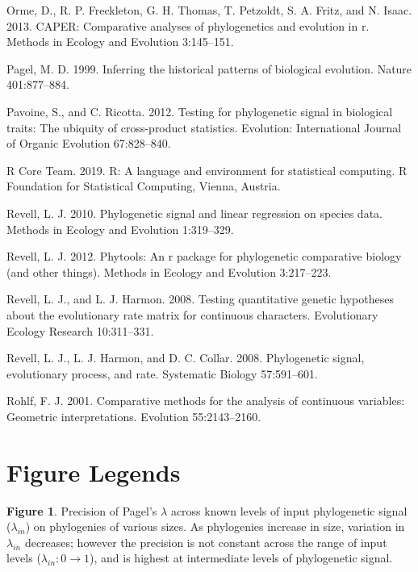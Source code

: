 \documentclass[
]{article}
\begin{document}
\leavevmode\hypertarget{ref-Orme2013}{}%
Orme, D., R. P. Freckleton, G. H. Thomas, T. Petzoldt, S. A. Fritz, and
N. Isaac. 2013. CAPER: Comparative analyses of phylogenetics and
evolution in r. Methods in Ecology and Evolution 3:145--151.

\leavevmode\hypertarget{ref-Pagel1999}{}%
Pagel, M. D. 1999. Inferring the historical patterns of biological
evolution. Nature 401:877--884.

\leavevmode\hypertarget{ref-Pavoine2012}{}%
Pavoine, S., and C. Ricotta. 2012. Testing for phylogenetic signal in
biological traits: The ubiquity of cross-product statistics. Evolution:
International Journal of Organic Evolution 67:828--840.

\leavevmode\hypertarget{ref-RCT}{}%
R Core Team. 2019. R: A language and environment for statistical
computing. R Foundation for Statistical Computing, Vienna, Austria.

\leavevmode\hypertarget{ref-Revell2010}{}%
Revell, L. J. 2010. Phylogenetic signal and linear regression on species
data. Methods in Ecology and Evolution 1:319--329.

\leavevmode\hypertarget{ref-Revell2012}{}%
Revell, L. J. 2012. Phytools: An r package for phylogenetic comparative
biology (and other things). Methods in Ecology and Evolution 3:217--223.

\leavevmode\hypertarget{ref-RevellHarmon2008}{}%
Revell, L. J., and L. J. Harmon. 2008. Testing quantitative genetic
hypotheses about the evolutionary rate matrix for continuous characters.
Evolutionary Ecology Research 10:311--331.

\leavevmode\hypertarget{ref-Revell_et_al2008}{}%
Revell, L. J., L. J. Harmon, and D. C. Collar. 2008. Phylogenetic
signal, evolutionary process, and rate. Systematic Biology 57:591--601.

\leavevmode\hypertarget{ref-Rohlf2001}{}%
Rohlf, F. J. 2001. Comparative methods for the analysis of continuous
variables: Geometric interpretations. Evolution 55:2143--2160.

\newpage

\hypertarget{figure-legends}{%
\section{Figure Legends}\label{figure-legends}}

\textbf{Figure 1}. Precision of Pagel's \(\lambda\) across known levels
of input phylogenetic signal (\(\lambda_{in}\)) on phylogenies of
various sizes. As phylogenies increase in size, variation in
\(\lambda_{in}\) decreases; however the precision is not constant across
the range of input levels (\(\lambda_{in}: 0 \to 1\)), and is highest at
intermediate levels of phylogenetic signal. \hfill\break
\end{document}
